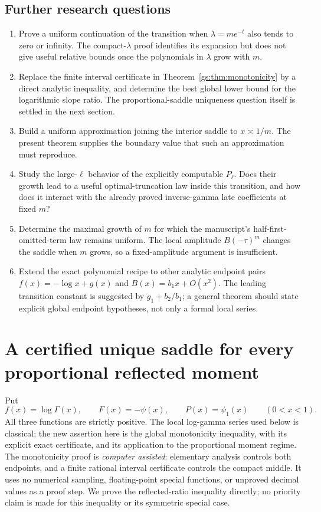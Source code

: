 \documentclass[11pt,a4paper]{article}
\numberwithin{equation}{section}
\theoremstyle{plain}
\theoremstyle{definition}
\theoremstyle{remark}
\begin{document}
\subsection{Further research questions}

\begin{enumerate}
\item Prove a uniform continuation of the transition when
$\lambda=me^{-t}$ also tends to zero or infinity. The compact-$\lambda$
proof identifies its expansion but does not give useful relative
bounds once the polynomials in $\lambda$ grow with $m$.
\item Replace the finite interval certificate in
Theorem~\ref{gs:thm:monotonicity} by a direct analytic inequality,
and determine the best global lower bound for the logarithmic
slope ratio. The proportional-saddle uniqueness question itself
is settled in the next section.
\item Build a uniform approximation joining the interior saddle to
$x\asymp1/m$. The present theorem supplies the boundary value that
such an approximation must reproduce.
\item Study the large-$\ell$ behavior of the explicitly computable
$P_\ell$. Does their growth lead to a useful optimal-truncation law
inside this transition, and how does it interact with the already
proved inverse-gamma late coefficients at fixed $m$?
\item Determine the maximal growth of $m$ for which the manuscript's
half-first-omitted-term law remains uniform. The local amplitude
$B(-\tau)^m$ changes the saddle when $m$ grows, so a fixed-amplitude
argument is insufficient.
\item Extend the exact polynomial recipe to other analytic endpoint
pairs $f(x)=-\log x+g(x)$ and $B(x)=b_1x+O(x^2)$. The leading
transition constant is suggested by $g_1+b_2/b_1$; a general theorem
should state explicit global endpoint hypotheses, not only a formal
local series.
\end{enumerate}


\section{A certified unique saddle for every proportional reflected moment}
\label{gs:sec:main}

Put
\[
 f(x)=\log\Gamma(x),\qquad F(x)=-\psi(x),\qquad P(x)=\psi_1(x)
 \qquad(0<x<1).
\]
All three functions are strictly positive. The local log-gamma series
used below is classical; the new assertion here is the global
monotonicity inequality, with its explicit exact certificate, and its
application to the proportional moment regime. The monotonicity proof
is \emph{computer assisted}: elementary analysis controls both endpoints,
and a finite rational interval certificate controls the compact middle.
It uses no numerical sampling, floating-point special functions, or
unproved decimal values as a proof step. We prove the reflected-ratio
inequality directly; no priority claim is made for this inequality or
its symmetric special case.
\end{document}
